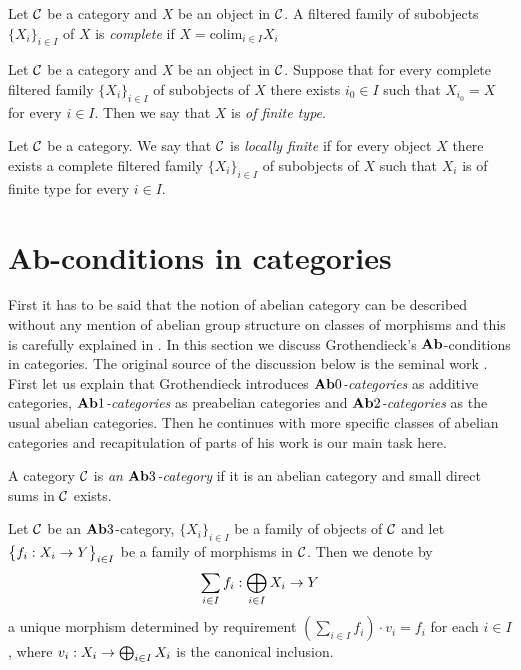 \begin{definition}
Let ${\mathcal C}$ be a category and $X$ be an object in ${\mathcal C}$. A filtered family of subobjects $\{X_i\}_{i\in I}$ of $X$ is \textit{complete} if $X = \mathrm{colim}_{i\in I}X_i$
\end{definition}

\begin{definition}
Let ${\mathcal C}$ be a category and $X$ be an object in ${\mathcal C}$. Suppose that for every complete filtered family $\{X_i\}_{i\in I}$ of subobjects of $X$ there exists $i_0\in I$ such that $X_{i_0} = X$ for every $i\in I$. Then we say that $X$ is \textit{of finite type}.
\end{definition}

\begin{definition}
Let ${\mathcal C}$ be a category. We say that ${\mathcal C}$ is \textit{locally finite} if for every object $X$ there exists a complete filtered family $\{X_i\}_{i \in I}$ of subobjects of $X$ such that $X_i$ is of finite type for every $i\in I$.
\end{definition}

\section{\textbf{Ab}-conditions in categories}
\noindent
First it has to be said that the notion of abelian category can be described without  any mention of abelian group structure on classes of morphisms and this is carefully explained in \cite{freyd1962abelian}. In this section we discuss Grothendieck's $\mathbf{Ab}$-conditions in categories. The original source of the discussion below is the seminal work \cite{grothendieck1957}. First let us explain that Grothendieck introduces \textit{$\mathbf{Ab}0$-categories} as additive categories, \textit{$\mathbf{Ab}1$-categories} as preabelian categories and \textit{$\mathbf{Ab}2$-categories} as the usual abelian categories. Then he continues with more specific classes of abelian categories and recapitulation of parts of his work is our main task here.

\begin{definition}
A category ${\mathcal C}$ is \textit{an $\mathbf{Ab}3$-category} if it is an abelian category and small direct sums in ${\mathcal C}$ exists.
\end{definition}
\noindent
Let ${\mathcal C}$ be an $\mathbf{Ab}3$-category, $\{X_i\}_{i\in I}$ be a family of objects of ${\mathcal C}$ and let $\big\{f_i:X_i\rightarrow Y\big\}_{i\in I}$ be a family of morphisms in ${\mathcal C}$. Then we denote by 
$$\sum_{i\in I}f_i:\bigoplus_{i\in I}X_i\rightarrow Y$$
a unique morphism determined by requirement $\left(\sum_{i\in I}f_i\right)\cdot v_i = f_i$ for each $i\in I$, where $v_i:X_i\rightarrow \bigoplus_{i\in I}X_i$ is the canonical inclusion.

